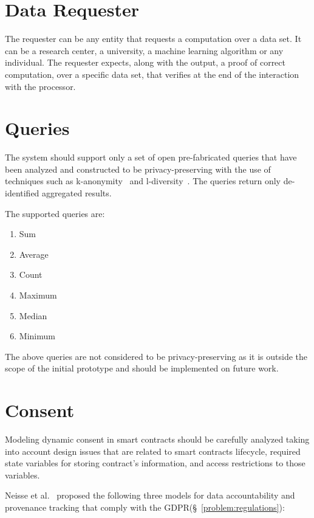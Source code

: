 \section{Data Requester}
\label{solution:data_req}

The requester can be any entity that requests a computation over a data set. It can be a research center, a university, a machine learning algorithm or any individual. The requester expects, along with the output, a proof of correct computation, over a specific data set, that verifies at the end of the interaction with the processor.

\section{Queries}
\label{solution:queries}

The system should support only a set of open pre-fabricated queries that have been analyzed and constructed to be privacy-preserving with the use of techniques such as k-anonymity~\cite{Samarati98protectingprivacy} and l-diversity~\cite{Aggarwal2008}. The queries return only de-identified aggregated results.

The supported queries are:

\begin{enumerate}
  \item Sum
  \item Average
  \item Count
  \item Maximum
  \item Median
  \item Minimum
\end{enumerate}

The above queries are not considered to be privacy-preserving as it is outside the scope of the initial prototype and should be implemented on future work.

\section{Consent}
\label{solution:consent}

Modeling dynamic consent in smart contracts should be carefully analyzed taking into account design issues that are related to smart contracts lifecycle, required state variables for storing contract’s information, and access restrictions to those variables.

Neisse et al.~\cite{DBLP:journals/corr/NeisseSF17} proposed the following three models for data accountability and provenance tracking that comply with the GDPR(§~\ref{problem:regulations}):

